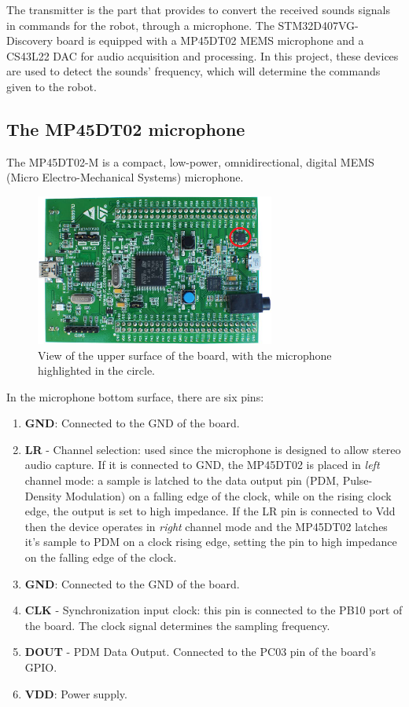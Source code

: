 The transmitter is the part that provides to convert the received sounds signals in commands for the robot, through a microphone. The STM32D407VG-Discovery board is equipped with a MP45DT02 MEMS microphone and a CS43L22 DAC for audio acquisition and processing. In this project, these devices are used to detect the sounds' frequency, which will determine the commands given to the robot.

\subsection{The MP45DT02 microphone}
The MP45DT02-M is a compact, low-power, omnidirectional, digital MEMS (Micro Electro-Mechanical Systems) microphone.
\begin{figure}[H]
	\hspace*{0.15 \textwidth}\includegraphics[width= 0.7\textwidth]
	{files/images/board_view}
	\caption{View of the upper surface of the board, with the microphone highlighted in the circle.}
\end{figure}

In the microphone bottom surface, there are six pins:
\begin{enumerate}
	\item \textbf{GND}: Connected to the GND of the board.
	\item \textbf{LR} - Channel selection: used since the microphone is designed to allow stereo audio capture. If it is connected to GND, the MP45DT02 is placed in \textit{left} channel mode: a sample is latched to the data output pin (PDM, Pulse-Density Modulation) on a falling edge of the clock, while on the rising clock edge, the output is set to high impedance. If the LR pin is connected to Vdd then the device operates in \textit{right} channel mode and the MP45DT02 latches it's sample to PDM on a clock rising edge, setting the pin to high impedance on the falling edge of the clock.
	\item \textbf{GND}: Connected to the GND of the board.
	\item \textbf{CLK} - Synchronization input clock: this pin is connected to the PB10 port of the board. The clock signal determines the sampling frequency.
	\item \textbf{DOUT} - PDM Data Output. Connected to the PC03 pin of the board's GPIO.
	\item \textbf{VDD}: Power supply.
\end{enumerate}

